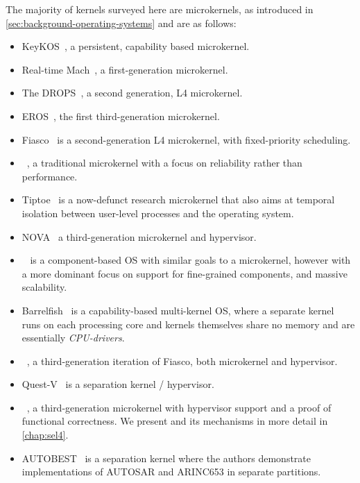 The majority of kernels surveyed here are microkernels, as introduced in
\cref{sec:background-operating-systems} and are as follows: 

\begin{itemize}
    \item KeyKOS~\citep{Bomberger_FFHLS_92}, a persistent, capability based microkernel. 
    \item Real-time Mach~\citep{Mercer_RZ_94, Mercer_ST_93}, a first-generation microkernel.
    \item The \gls{DROPS}~\citep{Haertig_BBHHMRSW_98}, a second
        generation, L4 microkernel.
    \item EROS~\citep{Shapiro_SF_99}, the first third-generation microkernel.
    \item Fiasco~\citep{Hohmuth_02} is a second-generation L4 microkernel, with fixed-priority scheduling.
    \item \minix~\citep{Herder_BGHT_06}, a traditional microkernel with a focus on reliability
        rather than performance. 
    \item Tiptoe~\citep{Craciunas_KPRS_09} is a now-defunct research microkernel that also aims at
temporal isolation between user-level processes and the operating system.
    \item NOVA~\citep{Steinberg_Kauer_10} a third-generation microkernel and hypervisor.
    \item \composite~\citep{Parmer:phd} is a component-based \gls{OS} with similar goals to a microkernel,
however with a more dominant focus on support for fine-grained components, and massive scalability.
    \item Barrelfish~\citep{Peter_SBBIHR_10} is a capability-based multi-kernel \gls{OS}, where a separate kernel runs on each processing core and kernels themselves share no memory and are essentially \emph{\gls{CPU}-drivers}.
    \item \fiascooc~\citep{Lackorzynski_WVH_12}, a third-generation iteration of Fiasco, both microkernel and
        hypervisor.
    \item Quest-V~\citep{Danish_LW_11} is a separation kernel / hypervisor.
    \item \selfour~\citep{Klein_AEMSKH_14}, a third-generation microkernel with
        hypervisor support and a proof of functional correctness. We present \selfour 
        and its mechanisms in more detail in \cref{chap:sel4}.
    \item AUTOBEST~\citep{Zuepke_BL_15} is a separation kernel where the authors demonstrate implementations
           of AUTOSAR and ARINC653 in separate partitions.
\end{itemize}

